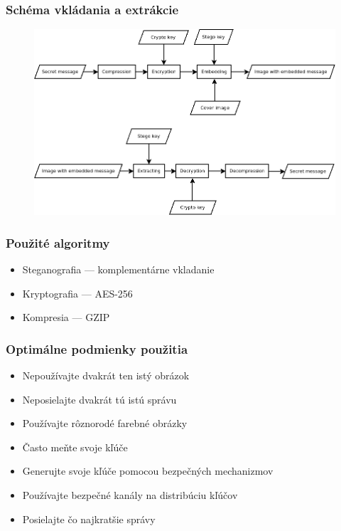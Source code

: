 \documentclass{beamer}
\begin{document}
\begin{frame}
    \frametitle{Schéma vkládania a extrákcie}
    \begin{figure}
    \centerline{\includegraphics[width=\textwidth]{diagrams/flow.png}}
    
    \end{figure}
    
\end{frame}

\begin{frame}
    \frametitle{Použité algoritmy}
    \begin{itemize}
        \item Steganografia --- komplementárne vkladanie
        \item Kryptografia --- AES-256
        \item Kompresia --- GZIP
    \end{itemize}
    
\end{frame}

\begin{frame}
    \frametitle{Optimálne podmienky použitia}
    \begin{itemize}
        \item Nepoužívajte dvakrát ten istý obrázok
        \item Neposielajte dvakrát tú istú správu
        \item Používajte rôznorodé farebné obrázky
        \item Často meňte svoje kľúče
        \item Generujte svoje kľúče pomocou bezpečných mechanizmov
        \item Používajte bezpečné kanály na distribúciu kľúčov
        \item Posielajte čo najkratšie správy
    \end{itemize}
\end{frame}
\end{document}
